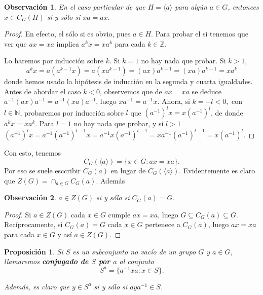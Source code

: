 \documentclass[12pt]{article}
\newtheorem{proposition}[theorem]{Proposición}
\newtheorem{observation}{Observación}[theorem]
\begin{document}
\begin{observation}En el caso particular de que $H = \langle a \rangle$ para algún $a \in G$, entonces $x \in C_G(H)$ si y sólo si $xa = ax.$
\end{observation}
\begin{proof}
En efecto, el sólo si es obvio, pues $a \in H$. Para probar el si tenemos que ver que $ax = xa$ implica $a^kx = xa^k$ para cada $k \in \mathbb{Z}$. 

Lo haremos por inducción sobre $k$. Si $k=1$ no hay nada que probar. Si $k>1$, $$a^kx = a(a^{k-1}x) = a(xa^{k-1}) = (ax)a^{k-1} = (xa)a^{k-1} = xa^k$$ donde hemos usado la hipótesis de inducción en la segunda y cuarta igualdades. Antes de abordar el caso $k<0$, observemos que de $ax = xa$ se deduce $a^{-1}(ax)a^{-1} = a^{-1}(xa)a^{-1}$, luego $xa^{-1} = a^{-1}x$. Ahora, si $k = -l < 0,$ con $l \in \mathbb{N}$, probaremos por inducción sobre $l$ que $(a^{-1})^lx = x(a^{-1})^l$, de donde $a^kx = xa^k$. Para $l = 1$ no hay nada que probar, y si $l>1$ $(a^{-1})^lx = a^{-1}(a^{-1})^{l-1}x = a^{-1}x (a^{-1})^{l-1} = xa^{-1}(a^{-1})^{l-1} = x(a^{-1})^l.$

\end{proof}

Con esto, tenemos $$C_G(\langle a \rangle) = \lbrace x \in G : ax = xa \rbrace.$$ Por eso se suele esccribir $C_G(a)$ en lugar de $C_G(\langle a \rangle)$. Evidentemente es claro que $Z(G) = \cap_{a \in G} C_G(a)$. Además

\begin{observation}$a \in Z(G)$ si y sólo si $C_G(a) = G$.
\end{observation}
\begin{proof}
Si $a \in Z(G)$ cada $x\in G$ cumple $ax = xa$, luego $G \subseteq C_G(a) \subseteq G$. Recíprocamente, si $C_G(a) = G$ cada $x \in G$ pertenece a $C_G(a)$, luego $ax = xa$ para cada $x \in G$ y así $a \in Z(G)$.

\end{proof}

\begin{proposition}Si $S$ es un subconjunto no vacío de un grupo $G$ y $a \in G$, llamaremos \textbf{conjugado de $S$ por $a$} al conjunto $$S^a = \lbrace a^{-1}xa: x \in S \rbrace.$$

Además, es claro que $y \in S^a$ si y sólo si $aya^{-1} \in S$.
\end{proposition}
\end{document}
